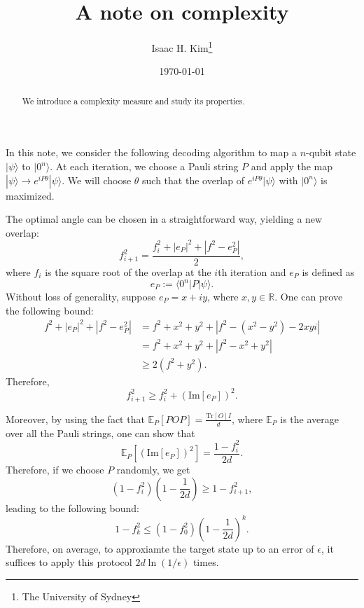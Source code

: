 \documentclass[11pt]{article}
\begin{document}
\title{A note on complexity}

\author{\normalsize Isaac H. Kim\thanks{The University of Sydney}}

\date{\today} 
\maketitle
\begin{abstract}
  We introduce a complexity measure and study its properties.
\end{abstract}                             

In this note, we consider the following decoding algorithm to map a $n$-qubit state $|\psi\rangle$ to $|0^n\rangle$. At each iteration, we choose a Pauli string $P$ and apply the map $|\psi\rangle \to e^{iP\theta}|\psi\rangle$. We will choose $\theta$ such that the overlap of $e^{iP\theta}|\psi\rangle$ with $|0^{n}\rangle$ is maximized.

The optimal angle can be chosen in a straightforward way, yielding a new overlap:
\begin{equation}
  f_{i+1}^2 = \frac{f_i^2 + |e_P|^2 + |f^2 - e_P^2|}{2},
\end{equation}
where $f_i$ is the square root of the overlap at the $i$th iteration and $e_P$ is defined as
\begin{equation}
  e_P := \langle 0^n| P|\psi\rangle.
\end{equation}
Without loss of generality, suppose $e_P =x+ iy$, where $x,y\in \mathbb{R}$. One can prove the following bound:
\begin{equation}
  \begin{aligned}
    f^2 + |e_P|^2 + |f^2-e_P^2| &= f^2 + x^2 + y^2 + |f^2 - (x^2-y^2)-2xyi| \\
    &= f^2 + x^2 + y^2 + |f^2 - x^2 + y^2| \\
    &\geq 2(f^2 + y^2).
  \end{aligned}
  \label{eq:inequalities}
 \end{equation}
 Therefore,
 \begin{equation}
   f_{i+1}^2 \geq f_{i}^2 + (\text{Im}[e_P])^2.
 \end{equation}

 Moreover, by using the fact that $\mathbb{E}_P[P O P] = \frac{\text{Tr}[O] I}{d}$, where $\mathbb{E}_P$ is the average over all the Pauli strings, one can show that
 \begin{equation}
   \mathbb{E}_P [(\text{Im}[e_P])^2]  = \frac{1-f_{i}^2}{2d}.
 \end{equation}
 Therefore, if we choose $P$ randomly, we get
 \begin{equation}
   (1-f_i^2)\left(1-\frac{1}{2d}\right) \geq 1-f_{i+1}^2,
 \end{equation}
 leading to the following bound:
 \begin{equation}
   1-f_k^2 \leq (1-f_0^2)\left(1-\frac{1}{2d} \right)^k. \label{eq:infidelity_decay}
 \end{equation}
Therefore, on average, to approxiamte the target state up to an error of $\epsilon$, it suffices to apply this protocol $2d\ln(1/\epsilon)$ times.
\end{document}
